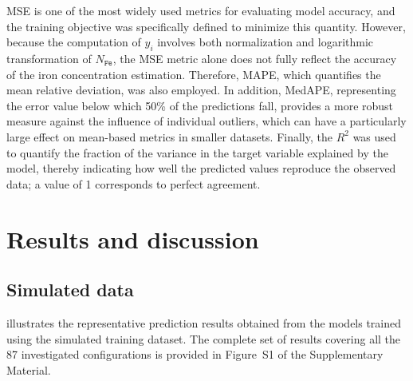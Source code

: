 \documentclass[10pt]{iopart}
\begin{document}
MSE is one of the most widely used metrics for evaluating model accuracy,
and the training objective was specifically defined to minimize this quantity.
However, because the computation of $y_i$ involves both normalization and logarithmic transformation of $N_\mathtt{Fe}$,
the MSE metric alone does not fully reflect the accuracy of the iron concentration estimation.
Therefore, MAPE, which quantifies the mean relative deviation, was also employed.
In addition, MedAPE, representing the error value below which 50\% of the predictions fall,
provides a more robust measure against the influence of individual outliers,
which can have a particularly large effect on mean-based metrics in smaller datasets.
Finally, the $R^2$ was used to quantify the fraction of the variance in the
target variable explained by the model,
thereby indicating how well the predicted values reproduce the observed data;
a value of 1 corresponds to perfect agreement.


\section{Results and discussion}\label{sec:Rez}
\subsection{Simulated data}

 illustrates the representative prediction results obtained from the models trained using  the simulated training dataset.
The complete set of results covering all the 87 investigated configurations is provided in Figure~S1 of the Supplementary Material.

\end{document}

